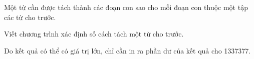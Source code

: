 Một từ cần được tách thành các đoạn con sao cho mỗi đoạn con thuộc một tập các từ cho trước.  

   Viết chương trình xác định số cách tách một từ cho trước.  

   Do kết quả có thể có giá trị lớn, chỉ cần in ra phần dư của kết quả cho 1337377.